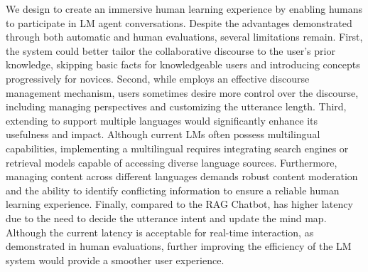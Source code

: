 We design \system to create an immersive human learning experience by enabling humans to participate in LM agent conversations. Despite the advantages demonstrated through both automatic and human evaluations, several limitations remain. First, the system could better tailor the collaborative discourse to the user’s prior knowledge, skipping basic facts for knowledgeable users and introducing concepts progressively for novices. Second, while \system employs an effective discourse management mechanism, users sometimes desire more control over the discourse, including managing \expert perspectives and customizing the utterance length. Third, extending \system to support multiple languages would significantly enhance its usefulness and impact. Although current LMs often possess multilingual capabilities, implementing a multilingual \system requires integrating search engines or retrieval models capable of accessing diverse language sources. Furthermore, managing content across different languages demands robust content moderation and the ability to identify conflicting information to ensure a reliable human learning experience. Finally, compared to the RAG Chatbot, \system has higher latency due to the need to decide the utterance intent and update the mind map. Although the current latency is acceptable for real-time interaction, as demonstrated in human evaluations, further improving the efficiency of the LM system would provide a smoother user experience.


